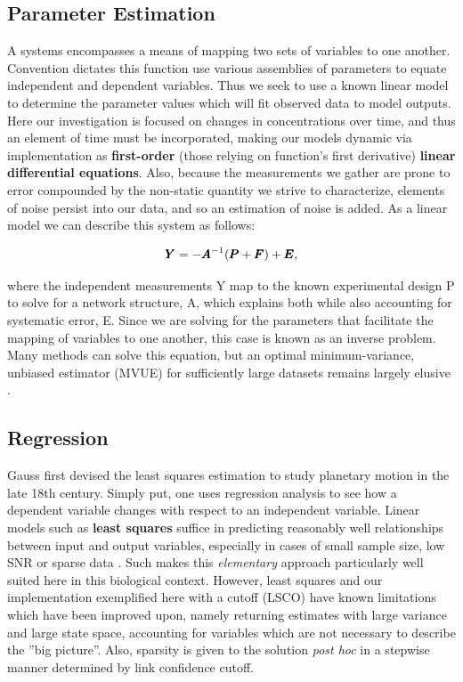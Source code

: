 \subsection{Parameter Estimation}
\label{sec:parest}
A systems encompasses a means of mapping two sets of variables to one another. Convention dictates this function use various assemblies of parameters to equate independent and dependent variables. Thus we seek to use a known linear model to determine the parameter values which will fit observed data to model outputs. Here our investigation is focused on changes in concentrations over time, and thus an element of time must be incorporated, making our models dynamic via implementation as \textbf{first-order} (those relying on function's first derivative) \textbf{linear differential equations}. Also, because the measurements we gather are prone to error compounded by the non-static quantity we strive to characterize, elements of noise persist into our data, and so an estimation of noise is added. As a linear model we can describe this system as follows:

\begin{equation}
\label{eq:Linearmap}
  {\pmb{Y}} = -{\pmb{A}}^{-1}({\pmb{P}}+{\pmb{F}})+ {\pmb{E}},
\end{equation}

where the independent measurements Y map to the known experimental design P to solve for a network structure, A, which explains both while also accounting for systematic error, E. Since we are solving for the parameters that facilitate the mapping of variables to one another, this case is known as an inverse problem. Many methods can solve this equation, but an optimal minimum-variance, unbiased estimator (MVUE) for sufficiently large datasets remains largely elusive \citep{kay1993fundamentals}. 



\subsection{Regression}
\label{sec:regress}
Gauss first devised the least squares estimation to study planetary motion in the late 18th century. Simply put, one uses regression analysis to see how a dependent variable changes with respect to an independent variable. Linear models such as \textbf{least squares} suffice in predicting reasonably well relationships between input and output variables, especially in cases of small sample size, low SNR or sparse data \cite[p.43]{friedman2001elements}. Such makes this \emph{elementary} approach particularly well suited here in this biological context. However, least squares and our implementation exemplified here with a cutoff (LSCO) have known limitations which have been improved upon, namely returning estimates with large variance and large state space, \ie accounting for variables which are not necessary to describe the ''big picture''\cite[p.57]{friedman2001elements}. Also, sparsity is given to the solution \emph{post hoc} in a stepwise manner determined by link confidence cutoff.


